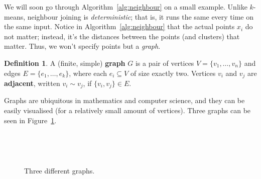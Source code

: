 \documentclass[a4paper, 12pt]{article}
\numberwithin{equation}{section}
\numberwithin{figure}{section}
\theoremstyle{definition}
\newtheorem{defn}[thm]{Definition}
\begin{document}
We will soon go through Algorithm~\ref{alg:neighbour} on a small example. Unlike
$k$-means, neighbour joining is \emph{deterministic}; that is, it runs the same
every time on the same input. Notice in Algorithm~\ref{alg:neighbour} that the actual
points $x_i$ do not matter; instead, it's the distances between the points (and
clusters) that matter. Thus, we won't specify points but a \emph{graph}.

\begin{defn}
	A (finite, simple) \textbf{graph} $G$ is a pair of vertices $V = \{v_1,
	\dots, v_n\}$ and edges $E = \{e_1, \dots, e_k\}$, where each $e_i\subseteq
	V$ of size exactly two. Vertices $v_i$ and $v_j$ are \textbf{adjacent},
	written $v_i \sim v_j$, if $\{v_i, v_j\} \in E$.
\end{defn}

Graphs are ubiquitous in mathematics and computer science, and they can be
easily visualised (for a relatively small amount of vertices). Three graphs can
be seen in Figure~\ref{fig:3-graphs}.

\begin{figure}[h]
	\centering
	\begin{minipage}{0.3\textwidth}
		\centering
	\end{minipage}~
	\begin{minipage}{0.3\textwidth}
		\centering
	\end{minipage}~
	\begin{minipage}{0.3\textwidth}
		\centering
	\end{minipage}
	\caption{Three different graphs.}
	\label{fig:3-graphs}
\end{figure}
\end{document}
